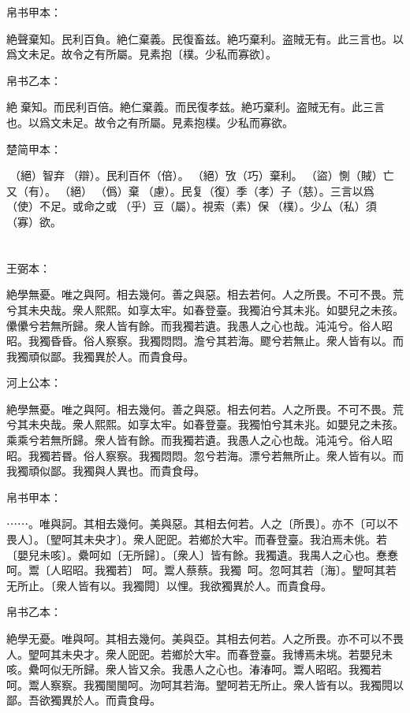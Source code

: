 \documentclass[a5paper]{ctexbook}
\begin{document}
    帛书甲本：

    絶聲棄知。民利百負。絶仁棄義。民復畜兹。絶巧棄利。盗賊无有。此三言也。以爲文未足。故令之有所屬。見素抱〔樸。少私而寡欲〕。

    帛书乙本：

    絶𦔻棄知。而民利百倍。絶仁棄義。而民復孝兹。絶巧棄利。盗賊无有。此三言也。以爲文未足。故令之有所屬。見素抱樸。少私而寡欲。

    楚简甲本：

    󶴌（絕）智弃󶴉（辯）。民利百伓（倍）。󶴌（絕）攷（巧）棄利。󶴊（盜）惻（賊）亡又（有）。󶴌（絕）𢠿（僞）棄󶴍（慮）。民复（復）季（孝）子（慈）。三言以爲󶴎（使）不足。或命之或󶴋（乎）豆（屬）。視索（素）保󶴏（樸）。少厶（私）須（寡）欲。

    \chapter{}
    王弼本：

    絶學無憂。唯之與阿。相去幾何。善之與惡。相去若何。人之所畏。不可不畏。荒兮其未央哉。衆人熙熙。如享太牢。如春登臺。我獨泊兮其未兆。如嬰兒之未孩。儽儽兮若無所歸。衆人皆有餘。而我獨若遺。我愚人之心也哉。沌沌兮。俗人昭昭。我獨昏昏。俗人察察。我獨悶悶。澹兮其若海。飂兮若無止。衆人皆有以。而我獨頑似鄙。我獨異於人。而貴食母。

    河上公本：

    絶學無憂。唯之與阿。相去幾何。善之與惡。相去何若。人之所畏。不可不畏。荒兮其未央哉。衆人熙熙。如享太牢。如春登臺。我獨怕兮其未兆。如嬰兒之未孩。乘乘兮若無所歸。衆人皆有餘。而我獨若遺。我愚人之心也哉。沌沌兮。俗人昭昭。我獨若昬。俗人察察。我獨悶悶。忽兮若海。漂兮若無所止。衆人皆有以。而我獨頑似鄙。我獨與人異也。而貴食母。

    帛书甲本：

    ⋯⋯。唯與訶。其相去幾何。美與惡。其相去何若。人之〔所畏〕。亦不〔可以不畏人〕。〔朢呵其未央才〕。衆人巸巸。若鄉於大牢。而春登臺。我泊焉未佻。若〔嬰兒未咳〕。纍呵如〔无所歸〕。〔衆人〕皆有餘。我獨遺。我禺人之心也。惷惷呵。鬻〔人昭昭。我獨若〕󱁝呵。鬻人蔡蔡。我獨𨴽𨴽呵。忽呵其若〔海〕。朢呵其若无所止。〔衆人皆有以。我獨䦎〕以悝。我欲獨異於人。而貴食母。

    帛书乙本：

    絶學无憂。唯與呵。其相去幾何。美與亞。其相去何若。人之所畏。亦不可以不畏人。朢呵其未央才。衆人巸巸。若鄉於大牢。而春登臺。我博焉未垗。若嬰兒未咳。纍呵似无所歸。衆人皆又余。我愚人之心也。湷湷呵。鬻人昭昭。我獨若𨴽呵。鬻人察察。我獨閩閩呵。沕呵其若海。朢呵若无所止。衆人皆有以。我獨䦎以鄙。吾欲獨異於人。而貴食母。
\end{document}
